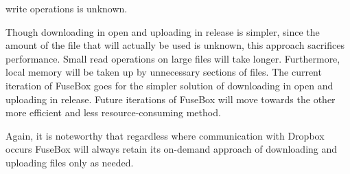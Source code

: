 \documentclass[11pt,twocolumn,letterpaper]{article}
\newcommand{\appname}{FuseBox }
\begin{document}
write operations is unknown. 
\par Though downloading in open and uploading
in release is simpler, since the amount of the file that will actually
be used is unknown, this approach sacrifices performance. Small read
operations on large files will take longer. Furthermore, local memory
will be taken up by unnecessary sections of files.  
The current iteration of
\appname goes for the simpler solution of downloading in open and
uploading in release. Future iterations of \appname will move towards
the other more efficient and less resource-consuming method.  
\par Again, it is noteworthy that regardless where communication with
Dropbox occurs \appname will
always retain its on-demand approach of downloading and uploading
files only as needed. 
\end{document}
